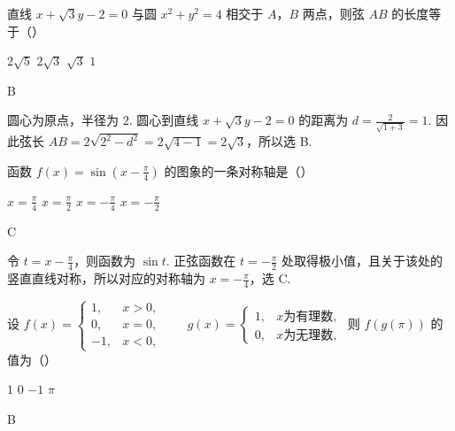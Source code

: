 \begin{problem}
直线 \(x + \sqrt{3} y - 2 = 0\) 与圆 \(x^{2} + y^{2} = 4\) 相交于 \(A\)，\(B\) 两点，则弦 \(AB\) 的长度等于（\quad）

\choices
    {\(2 \sqrt{5}\)}
    {\(2 \sqrt{3}\)}
    {\(\sqrt{3}\)}
    {\(1\)}
\end{problem}

\begin{answer}
B
\end{answer}

\begin{solution}
圆心为原点，半径为 \(2\). 圆心到直线 \(x+\sqrt{3}y-2=0\) 的距离为
\(d=\frac{2}{\sqrt{1+3}}=1\). 因此弦长
\(AB=2\sqrt{2^2-d^2}=2\sqrt{4-1}=2\sqrt{3}\)，所以选 B.
\end{solution}

\begin{problem}
函数 \( f(x) = \sin \left(x - \frac{\pi}{4}\right) \) 的图象的一条对称轴是（\quad）

\choices
    {\(x = \frac{\pi}{4}\)}
    {\(x = \frac{\pi}{2}\)}
    {\(x = -\frac{\pi}{4}\)}
    {\(x = -\frac{\pi}{2}\)}
\end{problem}

\begin{answer}
C
\end{answer}

\begin{solution}
令 \(t=x-\frac{\pi}{4}\)，则函数为 \(\sin t\). 正弦函数在 \(t=-\frac{\pi}{2}\) 处取得极小值，且关于该处的竖直直线对称，所以对应的对称轴为 \(x=-\frac{\pi}{4}\)，选 C.
\end{solution}

\begin{problem}
设 \(f(x) = \begin{cases}
1, & x > 0,\\
0, & x = 0,\\
-1, & x < 0,
\end{cases}
\qquad g(x) = \begin{cases}
1, & x \text{为有理数},\\
0, & x \text{为无理数},
\end{cases}\)
则 \(f(g(\pi))\) 的值为（\quad）

\choices
    {\(1\)}
    {\(0\)}
    {\(-1\)}
    {\(\pi\)}
\end{problem}

\begin{answer}
B
\end{answer}

